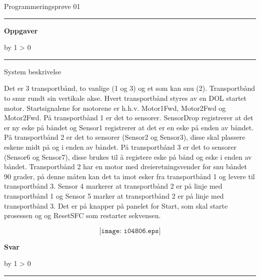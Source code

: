 \documentclass[12pt,norsk,a4paper]{book}
\def\oppgave{
            \advance\questnum by 1
            \ifnum \questnum > 0
                 \hrule
                 \vskip 3pt
                 \leftline{Oppgave \the\questnum}
                 \vskip 3pt \fi}
\def\svar{
           \advance\answnum by 1
           \ifnum \answnum > 0
                \hrule
                \vskip 3pt
                \leftline{Svar \the\answnum}
                \vskip 3pt \fi}
\begin{document}
\centerline{Programmeringsprøve 01}  \bigskip


\bigskip 
 
\hrule

\vfil \eject

\vfil \eject
\vfil \eject
\centerline{\bf Oppgaver}
\vskip 5pt
\oppgave{} 

System beskrivelse

Det er 3 transportbånd, to vanlige (1 og 3) og et som kan snu (2). Transportbånd to snur rundt sin vertikale akse. Hvert transportbånd styres av en DOL startet motor. Startsignalene
for motorene er h.h.v. Motor1Fwd, Motor2Fwd og Motor2Fwd. På transportbånd 1 er det to sensorer. SensorDrop registrerer at det er ny eske på båndet og Sensor1 registrerer at det er en eske på enden av båndet. På transportbånd 2 er det to sensorer (Sensor2 og Sensor3), disse skal plassere eskene midt på og i enden av båndet. På transportbånd 3 er det to sensorer (Sensor6 og Sensor7), disse brukes til å registere eske på bånd og eske i enden av båndet. Transportbånd 2 har en motor med dreieretningsvender for snu båndet 90 grader, på denne måten kan det ta imot esker fra transportbånd 1 og levere til transportbånd 3. Sensor 4 markerer at transportbånd 2 er på linje med transportbånd 1 og Sensor 5 marker at transportbånd 2 er på linje med transportbånd 3. Det er på knapper på panelet for Start, som skal starte prosessen og og ResetSFC som restarter sekvensen.   

$$\texttt{[image: i04806.eps]}$$
\vskip 10pt \filbreak 
\vfil \eject
\centerline{\bf Svar}
\vskip 5pt
\svar{} 
\vskip 10pt \filbreak 
\end{document}
